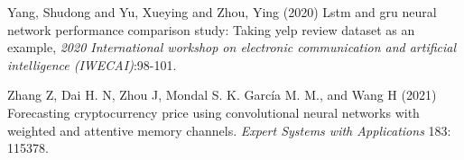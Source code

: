 \documentclass{dsfe}
\begin{document}
\begin{thebibliography}{999}
\newblock Yang, Shudong and Yu, Xueying and Zhou, Ying (2020)
\newblock Lstm and gru neural network performance comparison study: Taking yelp review dataset as an example,
\newblock \emph{2020 International workshop on electronic communication and artificial intelligence (IWECAI)}:98-101.

\newblock Zhang Z, Dai H. N, Zhou J, Mondal S. K. García M. M., and Wang H (2021)
\newblock Forecasting cryptocurrency price using convolutional neural networks with weighted and attentive memory channels.
\newblock \emph{ Expert Systems with Applications} 183: 115378.

\end{thebibliography}


\end{document}
